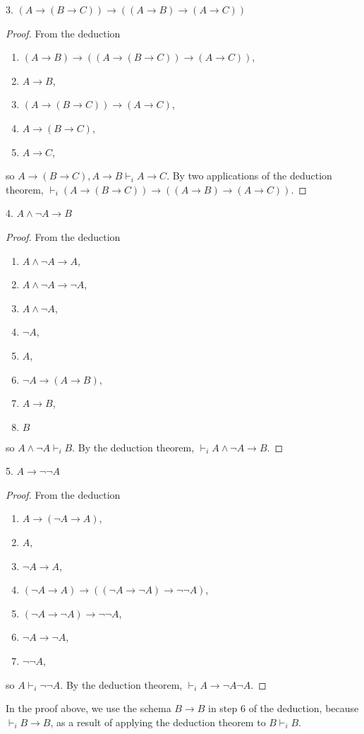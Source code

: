 \documentclass[12pt]{article}
\begin{document}
3. $(A \to (B\to C)) \to ((A\to B)\to (A\to C))$
\begin{proof} From the deduction
\begin{enumerate}
\item $(A \to B) \to ((A \to (B \to C)) \to (A \to C))$,
\item $A\to B$,
\item $(A \to (B \to C)) \to (A \to C)$,
\item $A \to (B\to C)$, 
\item $A \to C$,
\end{enumerate}
so $A \to (B\to C), A\to B \vdash_i A\to C$.  By two applications of the deduction theorem, $\vdash_i (A \to (B\to C)) \to ((A\to B)\to (A\to C))$.
\end{proof}

4. $A\land \neg A\to B$
\begin{proof} From the deduction
\begin{multicols}{3}
\begin{enumerate}
\item $A\land \neg A\to A$,
\item $A\land \neg A\to \neg A$,
\item $A\land \neg A$,
\item $\neg A$,
\item $A$,
\item $\neg A \to (A\to B)$,
\item $A \to B$, 
\item $B$
\end{enumerate}
\end{multicols}
so $A\land \neg A \vdash_i B$.  By the deduction theorem, $\vdash_i A\land \neg A\to B$.
\end{proof}

5. $A \to \neg \neg A$
\begin{proof} From the deduction
\begin{multicols}{2}
\begin{enumerate}
\item $A\to (\neg A \to A)$,
\item $A$,
\item $\neg A \to A$,
\item $(\neg A \to A) \to ((\neg A \to \neg A) \to \neg \neg A)$,
\item $(\neg A \to \neg A) \to \neg \neg A$,
\item $\neg A \to \neg A$,
\item $\neg \neg A$,
\end{enumerate}
\end{multicols}
so $A \vdash_i \neg \neg A$.  By the deduction theorem, $\vdash_i A \to \neg A \neg A$.
\end{proof}
In the proof above, we use the schema $B\to B$ in step 6 of the deduction, because $\vdash_i B\to B$, as a result of applying the deduction theorem to $B\vdash_i B$.
\end{document}
